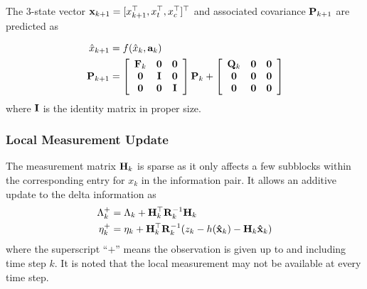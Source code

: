 The 3-state vector ${\bf x}_{k+1}=[x_{k+1}^\top,x_t^\top,x_c^\top]^\top$ and associated covariance ${\bf{\bf P}}_{k+1}$ are predicted as

\begin{equation}
\begin{split}
{\hat x}_{k+1}&=f({\hat x}_k,{\bf a}_k) \\
{\bf{\bf P}}_{k+1}&=\left[
                     \begin{array}{ccc}
                       {\bf F}_k & {\bf 0} & {\bf 0} \\
                       {\bf 0} & {\bf I} & {\bf 0} \\
                       {\bf 0} & {\bf 0} & {\bf I} \\
                     \end{array}
                   \right]{\bf{\bf P}}_k+\left[
                     \begin{array}{ccc}
                       {\bf Q}_k & {\bf 0} & {\bf 0} \\
                       {\bf 0} & {\bf 0} & {\bf 0} \\
                       {\bf 0} & {\bf 0} & {\bf 0} \\
                     \end{array}
                   \right]
\end{split}
\end{equation}
where $\bf I$ is the identity matrix in proper size.

\subsubsection{Local Measurement Update}

The measurement matrix ${\bf H}_{k}$ is sparse as it only affects a few subblocks within the corresponding entry for $x_k$ in the information pair. It allows an additive update to the delta information as
\begin{equation}
\begin{split}
\Lambda_{k}^+&=\Lambda_{k}+{\bf H}_{k}^\top{\bf R}_{k}^{-1}{\bf H}_{k} \\
\eta_{k}^+&=\eta_{k}+{\bf H}_{k}^\top{\bf R}_{k}^{-1}({z}_{k}-h({\bf\hat x}_{k})-{\bf H}_{k}{\bf\hat x}_{k})
\label{eq:EIF_update}
\end{split}
\end{equation}
where the superscript ``$+$'' means the observation is given up to and including time step $k$. It is noted that the local measurement may not be available at every time step.

